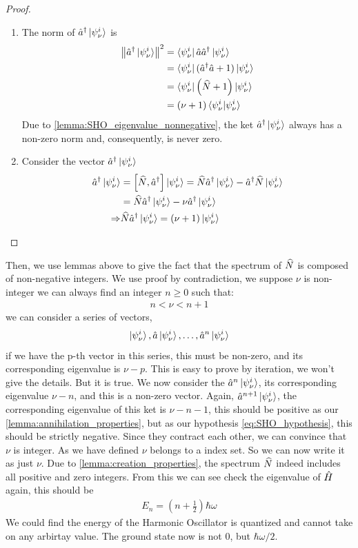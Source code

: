 \begin{proof}
    \begin{enumerate}
        \item The norm of $\hat{a}^ \dag \ket{\psi_ \nu^i}$ is 
        \begin{align}
            \left\lVert \hat{a}^ \dag \ket{\psi_ \nu^i} \right\rVert^2 &= \bra{\psi_ \nu^i} \hat{a} \hat{a}^ \dag \ket{\psi_ \nu^i} \notag \\
            &= \bra{\psi_ \nu^i} (\hat{a}^ \dag \hat{a} + 1) \ket{\psi_ \nu^i} \notag \\ 
            &= \bra{\psi_ \nu^i} \left(\widehat{N} + 1\right) \ket{\psi_ \nu^i} \notag \\
            &= \left(\nu + 1\right) \braket{\psi_ \nu^i| \psi_ \nu^i}
        \end{align}
        Due to \cref{lemma:SHO_eigenvalue_nonnegative}, the ket $\hat{a}^ \dag \ket{\psi_ \nu^i}$ always has a non-zero norm and, consequently, is never zero. 
        \item Consider the vector $\hat{a}^ \dag \ket{\psi_ \nu^i}$ 
        \begin{align}
            \hat{a}^ \dag \ket{\psi_ \nu^i} &= \left[ \widehat{N} , \hat{a}^ \dag \right] \ket{\psi_ \nu^i} = \widehat{N} \hat{a}^ \dag \ket{\psi_ \nu^i} - \hat{a}^ \dag \widehat{N} \ket{\psi_ \nu^i} \notag \\
            &= \widehat{N} \hat{a}^ \dag \ket{\psi_ \nu^i} -  \nu \hat{a}^ \dag \ket{\psi_ \nu^i} \notag \\
            \Rightarrow& \widehat{N} \hat{a}^ \dag \ket{\psi_ \nu^i} = \left( \nu + 1\right) \ket{\psi_ \nu^i}
        \end{align}
    \end{enumerate}
\end{proof}

Then, we use lemmas above to give the fact that the spectrum of $\widehat{N}$ is composed of non-negative integers. We use proof by contradiction, we suppose $ \nu$ is non-integer we can always find an integer $n \geq 0$ such that: 
\begin{eqnarray} 
    n <  \nu < n+1 \label{eq:SHO_hypothesis}
\end{eqnarray}
we can consider a series of vectors, 
\begin{eqnarray}
    \ket{\psi_ \nu^i}, \hat{a} \ket{\psi_ \nu^i}, \dots, \hat{a}^n \ket{\psi_ \nu^i}
\end{eqnarray}
if we have the p-th vector in this series, this must be non-zero, and its corresponding eigenvalue is $\nu -p$. This is easy to prove by iteration, we won't give the details. But it is true. We now consider the $\hat{a}^ n \ket{\psi_ \nu^i}$, its corresponding eigenvalue $ \nu - n$, and this is a non-zero vector. Again, $\hat{a}^ {n+1} \ket{\psi_ \nu^i}$, the corresponding eigenvalue of this ket is $\nu - n - 1$, this should be positive as our \cref{lemma:annihilation_properties}, but as our hypothesis \cref{eq:SHO_hypothesis}, this should be strictly negative. Since they contract each other, we can convince that $\nu$ is integer. As we have defined $\nu$ belongs to a index set. So we can now write it as just $\nu$. Due to \cref{lemma:creation_properties}, the spectrum $\widehat{N}$ indeed includes all positive and zero integers. From this we can see check the eigenvalue of $\hat{H}$ again, this should be 
\begin{eqnarray}
    E_n = \left(n+ \frac{1}{2}\right) \hbar \omega
\end{eqnarray}
We could find the energy of the Harmonic Oscillator is quantized and cannot take on any arbirtay value. The ground state now is not 0, but $\hbar \omega/2$.


